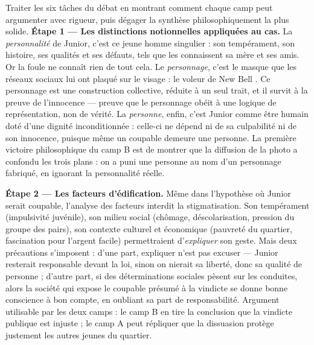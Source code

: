 \documentclass[11pt]{article}
\begin{document}
\begin{exoresolu}
Traiter les six tâches du débat en montrant comment chaque camp peut argumenter avec rigueur, puis dégager la synthèse philosophiquement la plus solide.
\tcblower
\textbf{Étape 1 — Les distinctions notionnelles appliquées au cas.} La \emph{personnalité} de Junior, c'est ce jeune homme singulier : son tempérament, son histoire, ses qualités et ses défauts, tels que les connaissent sa mère et ses amis. Or la foule ne connaît rien de tout cela. Le \emph{personnage}, c'est le masque que les réseaux sociaux lui ont plaqué sur le visage : \guillemotleft le voleur de New Bell \guillemotright. Ce personnage est une construction collective, réduite à un seul trait, et il survit à la preuve de l'innocence — preuve que le personnage obéit à une logique de représentation, non de vérité. La \emph{personne}, enfin, c'est Junior comme être humain doté d'une dignité inconditionnée : celle-ci ne dépend ni de sa culpabilité ni de son innocence, puisque même un coupable demeure une personne. La première victoire philosophique du camp B est de montrer que la diffusion de la photo a confondu les trois plans : on a puni une personne au nom d'un personnage fabriqué, en ignorant la personnalité réelle.

\textbf{Étape 2 — Les facteurs d'édification.} Même dans l'hypothèse où Junior serait coupable, l'analyse des facteurs interdit la stigmatisation. Son tempérament (impulsivité juvénile), son milieu social (chômage, déscolarisation, pression du groupe des pairs), son contexte culturel et économique (pauvreté du quartier, fascination pour l'argent facile) permettraient d'\emph{expliquer} son geste. Mais deux précautions s'imposent : d'une part, expliquer n'est pas excuser — Junior resterait responsable devant la loi, sinon on nierait sa liberté, donc sa qualité de personne ; d'autre part, si des déterminations sociales pèsent sur les conduites, alors la société qui expose le coupable présumé à la vindicte se donne bonne conscience à bon compte, en oubliant sa part de responsabilité. Argument utilisable par les deux camps : le camp B en tire la conclusion que la vindicte publique est injuste ; le camp A peut répliquer que la dissuasion protège justement les autres jeunes du quartier.


\end{exoresolu}
\end{document}
